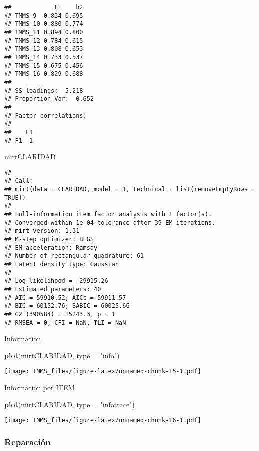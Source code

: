 \documentclass[
  10pt,
  spanish,
]{article}
\newenvironment{Shaded}{\begin{snugshade}}{\end{snugshade}}
\newcommand{\DataTypeTok}[1]{\textcolor[rgb]{0.13,0.29,0.53}{#1}}
\newcommand{\KeywordTok}[1]{\textcolor[rgb]{0.13,0.29,0.53}{\textbf{#1}}}
\newcommand{\NormalTok}[1]{#1}
\newcommand{\StringTok}[1]{\textcolor[rgb]{0.31,0.60,0.02}{#1}}
\begin{document}
\begin{verbatim}
##            F1    h2
## TMMS_9  0.834 0.695
## TMMS_10 0.880 0.774
## TMMS_11 0.894 0.800
## TMMS_12 0.784 0.615
## TMMS_13 0.808 0.653
## TMMS_14 0.733 0.537
## TMMS_15 0.675 0.456
## TMMS_16 0.829 0.688
## 
## SS loadings:  5.218 
## Proportion Var:  0.652 
## 
## Factor correlations: 
## 
##    F1
## F1  1
\end{verbatim}

\begin{Shaded}
\begin{Highlighting}[]
\NormalTok{mirtCLARIDAD}
\end{Highlighting}
\end{Shaded}

\begin{verbatim}
## 
## Call:
## mirt(data = CLARIDAD, model = 1, technical = list(removeEmptyRows = TRUE))
## 
## Full-information item factor analysis with 1 factor(s).
## Converged within 1e-04 tolerance after 39 EM iterations.
## mirt version: 1.31 
## M-step optimizer: BFGS 
## EM acceleration: Ramsay 
## Number of rectangular quadrature: 61
## Latent density type: Gaussian 
## 
## Log-likelihood = -29915.26
## Estimated parameters: 40 
## AIC = 59910.52; AICc = 59911.57
## BIC = 60152.76; SABIC = 60025.66
## G2 (390584) = 15243.3, p = 1
## RMSEA = 0, CFI = NaN, TLI = NaN
\end{verbatim}

Informacion

\begin{Shaded}
\begin{Highlighting}[]
\KeywordTok{plot}\NormalTok{(mirtCLARIDAD, }\DataTypeTok{type =} \StringTok{"info"}\NormalTok{)}
\end{Highlighting}
\end{Shaded}

\texttt{[image: TMMS\_files/figure-latex/unnamed-chunk-15-1.pdf]}

Informacion por ITEM

\begin{Shaded}
\begin{Highlighting}[]
\KeywordTok{plot}\NormalTok{(mirtCLARIDAD, }\DataTypeTok{type =} \StringTok{"infotrace"}\NormalTok{)}
\end{Highlighting}
\end{Shaded}

\texttt{[image: TMMS\_files/figure-latex/unnamed-chunk-16-1.pdf]}

\hypertarget{reparaciuxf3n}{%
\subsubsection{Reparación}\label{reparaciuxf3n}}
\end{document}
